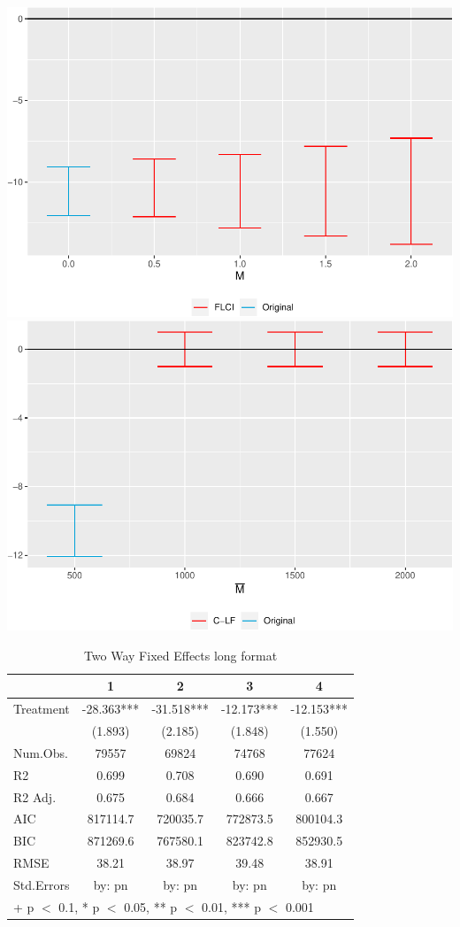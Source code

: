 \documentclass[
  12pt,
]{article}
\begin{document}
\includegraphics{Report_files/figure-latex/Figures-4.pdf}
\includegraphics{Report_files/figure-latex/Figures-5.pdf}

\begin{table}

\caption{\label{tab:table-4}Two Way Fixed Effects long format}
\centering
\begin{tabular}[t]{lcccc}
\toprule
  & 1 & 2 & 3 & 4\\
\midrule
Treatment & -28.363*** & -31.518*** & -12.173*** & -12.153***\\
 & (1.893) & (2.185) & (1.848) & (1.550)\\
\midrule
Num.Obs. & 79557 & 69824 & 74768 & 77624\\
R2 & 0.699 & 0.708 & 0.690 & 0.691\\
R2 Adj. & 0.675 & 0.684 & 0.666 & 0.667\\
AIC & 817114.7 & 720035.7 & 772873.5 & 800104.3\\
BIC & 871269.6 & 767580.1 & 823742.8 & 852930.5\\
RMSE & 38.21 & 38.97 & 39.48 & 38.91\\
Std.Errors & by: pn & by: pn & by: pn & by: pn\\
\bottomrule
\multicolumn{5}{l}{\rule{0pt}{1em}+ p $<$ 0.1, * p $<$ 0.05, ** p $<$ 0.01, *** p $<$ 0.001}\\
\end{tabular}
\end{table}
\end{document}
